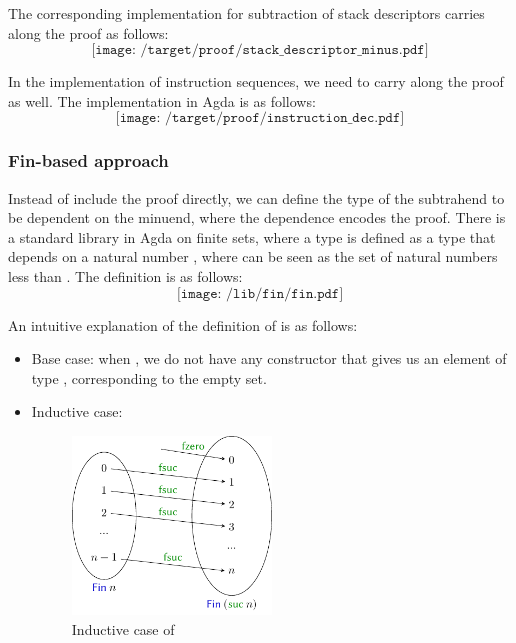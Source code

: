 \documentclass[12pt,a4paper]{report}
\theoremstyle{definition}
\newcommand{\mb}[1]{\textcolor{mediumblue}{#1}}
\begin{document}
    The corresponding implementation for subtraction of stack descriptors carries along the proof as follows:
    \[\texttt{[image: /target/proof/stack\_descriptor\_minus.pdf]}\]

    In the implementation of instruction sequences, we need to carry along the proof as well. The implementation in Agda is as follows:
    \[\texttt{[image: /target/proof/instruction\_dec.pdf]}\]

    \subsubsection{\textsf{Fin}-based approach}
    Instead of include the proof directly, we can define the type of the subtrahend to be dependent on the minuend, where the dependence encodes the proof. There is a standard library in Agda on finite sets, where a type \text{\mb{\mathsf{Fin}}} is defined as a type that depends on a natural number , where \text{\mb{\mathsf{Fin}}\ n} can be seen as the set of natural numbers less than . The definition is as follows:
    \[\texttt{[image: /lib/fin/fin.pdf]}\]

    An intuitive explanation of the definition of \text{\mb{\mathsf{Fin}}} is as follows:
    \begin{itemize}
        \item Base case: when , we do not have any constructor that gives us an element of type \text{\mb{\mathsf{Fin}}\ 0}, corresponding to the empty set. 
        \item Inductive case: 
        \begin{figure}[H]
            \centering
            \includegraphics[width=0.5\textwidth]{fin_inductive.pdf}
            \caption{Inductive case of \text{\mb{\mathsf{Fin}}}}
            \label{fig: fin_inductive}
        \end{figure}
    \end{itemize}
\end{document}
